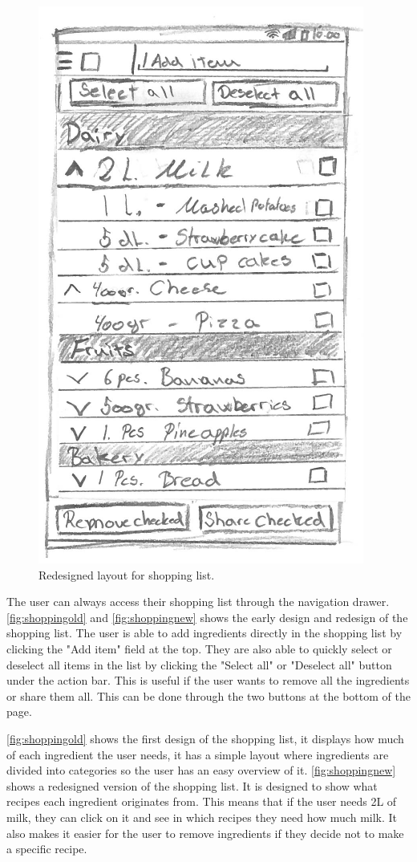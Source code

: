 \begin{figure}[H]
\begin{minipage}[b]{0.5\columnwidth}
\includegraphics[width=0.7\columnwidth]{img/prototypes/shopping_list_new.pdf}
\caption{Redesigned layout for shopping list\label{fig:shoppingnew}.}
\end{minipage}
\end{figure}

The user can always access their shopping list through the navigation drawer. \autoref{fig:shoppingold} and \autoref{fig:shoppingnew} shows the early design and redesign of the shopping list. The user is able to add ingredients directly in the shopping list by clicking the "Add item" field at the top. They are also able to quickly select or deselect all items in the list by clicking the "Select all" or "Deselect all" button under the action bar. This is useful if the user wants to remove all the ingredients or share them all. This can be done through the two buttons at the bottom of the page.

\autoref{fig:shoppingold} shows the first design of the shopping list, it displays how much of each ingredient the user needs, it has a simple layout where ingredients are divided into categories so the user has an easy overview of it. \autoref{fig:shoppingnew} shows a redesigned version of the shopping list. It is designed to show what recipes each ingredient originates from. This means that if the user needs 2L of milk, they can click on it and see in which recipes they need how much milk. It also makes it easier for the user to remove ingredients if they decide not to make a specific recipe.

